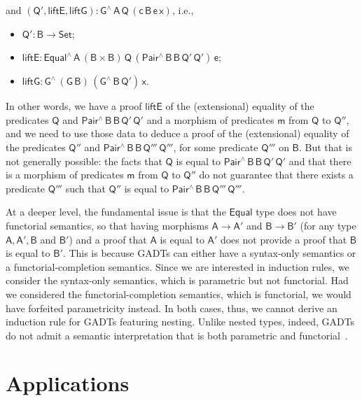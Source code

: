 \documentclass[9pt]{entcs}
\begin{document}
and $\mathsf{(Q', liftE, liftG) :G^{\wedge}\,A\,Q\,(c\,B\,e\,x)}$, i.e.,
\begin{itemize}
\item $\mathsf{Q' : B \to Set}$;
\item $\mathsf{liftE : Equal^{\wedge}\,A\,(B \times B)\,Q\,(Pair^{\wedge}\,B\,B\,Q'\,Q')\,e}$;
\item $\mathsf{liftG : G^{\wedge}\,(G\,B)\,(G^{\wedge}\,B\,Q')\,x}$.
\end{itemize}
In other words, we have a proof $\mathsf{liftE}$ of the (extensional) equality
of the predicates $\mathsf{Q}$ and $\mathsf{Pair^{\wedge}\,B\,B\,Q'\,Q'}$
and a morphism of predicates $\mathsf{m}$ from $\mathsf{Q}$ to $\mathsf{Q''}$,
and we need to use those data to deduce a proof of the (extensional) equality
of the predicates $\mathsf{Q''}$ and $\mathsf{Pair^{\wedge}\,B\,B\,Q'''\,Q'''}$,
for some predicate $\mathsf{Q'''}$ on $\mathsf{B}$.
But that is not generally possible:
the facts that $\mathsf{Q}$ is equal to $\mathsf{Pair^{\wedge}\,B\,B\,Q'\,Q'}$
and that there is a morphism of predicates $\mathsf{m}$ from $\mathsf{Q}$ to $\mathsf{Q''}$
do not guarantee that there exists a predicate $\mathsf{Q'''}$ such that $\mathsf{Q''}$ is equal to $\mathsf{Pair^{\wedge}\,B\,B\,Q'''\,Q'''}$.

At a deeper level, the fundamental issue is that
the $\mathsf{Equal}$ type does not have functorial semantics,
so that having morphisms $\mathsf{A \to A'}$ and $\mathsf{B \to B'}$
(for any type $\mathsf{A, A', B}$ and $\mathsf{B'}$)
and a proof that $\mathsf{A}$ is equal to $\mathsf{A'}$
does not provide a proof that $\mathsf{B}$ is equal to $\mathsf{B'}$.
This is because GADTs can either have a syntax-only semantics or a functorial-completion semantics.
Since we are interested in induction rules, we consider the syntax-only semantics,
which is parametric but not functorial.
Had we considered the functorial-completion semantics, which is functorial,
we would have forfeited parametricity instead.
In both cases, thus, we cannot derive an induction rule for GADTs featuring nesting.
Unlike nested types, indeed, GADTs do not admit a semantic interpretation that is both parametric and functorial~\cite{jgj21}.



\section{Applications}

\end{document}
